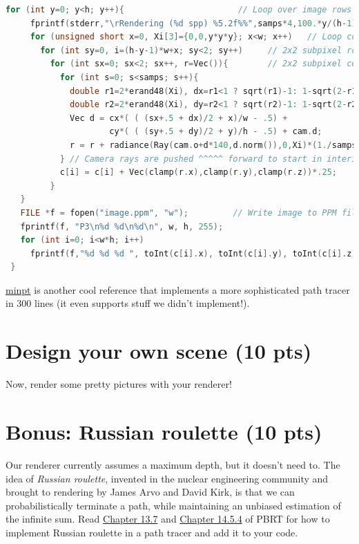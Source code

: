 \begin{lstlisting}[language=C++]
   for (int y=0; y<h; y++){                       // Loop over image rows 
     fprintf(stderr,"\rRendering (%d spp) %5.2f%%",samps*4,100.*y/(h-1)); 
     for (unsigned short x=0, Xi[3]={0,0,y*y*y}; x<w; x++)   // Loop cols 
       for (int sy=0, i=(h-y-1)*w+x; sy<2; sy++)     // 2x2 subpixel rows 
         for (int sx=0; sx<2; sx++, r=Vec()){        // 2x2 subpixel cols 
           for (int s=0; s<samps; s++){ 
             double r1=2*erand48(Xi), dx=r1<1 ? sqrt(r1)-1: 1-sqrt(2-r1); 
             double r2=2*erand48(Xi), dy=r2<1 ? sqrt(r2)-1: 1-sqrt(2-r2); 
             Vec d = cx*( ( (sx+.5 + dx)/2 + x)/w - .5) + 
                     cy*( ( (sy+.5 + dy)/2 + y)/h - .5) + cam.d; 
             r = r + radiance(Ray(cam.o+d*140,d.norm()),0,Xi)*(1./samps); 
           } // Camera rays are pushed ^^^^^ forward to start in interior 
           c[i] = c[i] + Vec(clamp(r.x),clamp(r.y),clamp(r.z))*.25; 
         } 
   } 
   FILE *f = fopen("image.ppm", "w");         // Write image to PPM file. 
   fprintf(f, "P3\n%d %d\n%d\n", w, h, 255); 
   for (int i=0; i<w*h; i++) 
     fprintf(f,"%d %d %d ", toInt(c[i].x), toInt(c[i].y), toInt(c[i].z)); 
 }
\end{lstlisting}
\href{https://github.com/hi2p-perim/minpt}{minpt} is another cool reference that implements a more sophisticated path tracer in 300 lines (it even supports stuff we didn't implement!).

\section{Design your own scene (10 pts)}
Now, render some pretty pictures with your renderer! 

\section{Bonus: Russian roulette (10 pts)}
Our renderer currently assumes a maximum depth, but it doesn't need to. The idea of \emph{Russian roulette}, invented in the nuclear engineering community and brought to rendering by James Arvo and David Kirk, is that we can probabilistically terminate a path, while maintaining an unbiased estimation of the infinite sum. Read \href{https://www.pbr-book.org/3ed-2018/Monte_Carlo_Integration/Russian_Roulette_and_Splitting}{Chapter 13.7} and \href{https://www.pbr-book.org/3ed-2018/Light_Transport_I_Surface_Reflection/Path_Tracing#fragment-PossiblyterminatethepathwithRussianroulette-0}{Chapter 14.5.4} of PBRT for how to implement Russian roulette in a path tracer and add it to your code.

